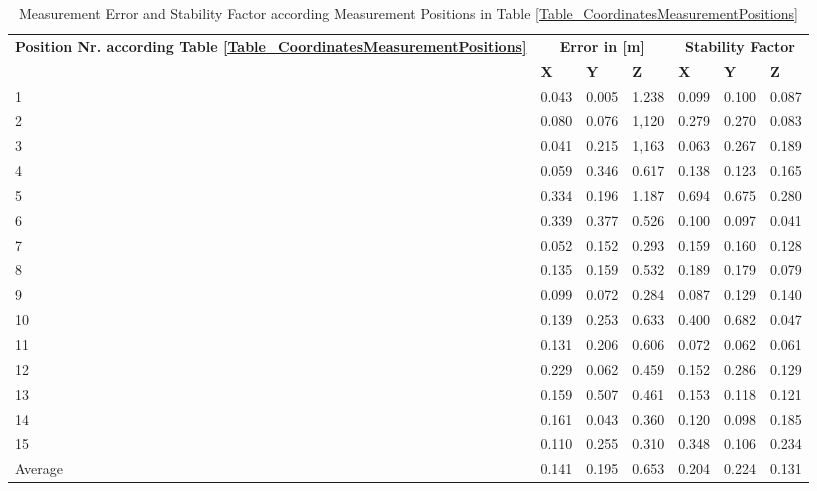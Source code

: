 \begin{table}[!h]
\begin{tabular}{|p{3cm}||p{}|p{}|p{}||p{}|p{}|p{}|}
\hline 
\textbf{Position Nr. according Table \ref{Table_CoordinatesMeasurementPositions}} & \multicolumn{3}{c||}{\textbf{Error in [m]}} & \multicolumn{3}{c|}{\textbf{Stability Factor}} \\ 
  & \textbf{X} & \textbf{Y} & \textbf{Z} & \textbf{X} & \textbf{Y} & \textbf{Z} \\ 
\hline
\hline 
1 & 0.043 & 0.005 & 1.238 & 0.099 & 0.100 & 0.087 \\ 
\hline 
2 & 0.080 & 0.076 & 1,120 & 0.279 & 0.270 & 0.083 \\ 
\hline 
3 & 0.041 & 0.215 & 1,163 & 0.063 & 0.267 & 0.189 \\ 
\hline 
4 & 0.059 & 0.346 & 0.617 & 0.138 & 0.123 & 0.165 \\ 
\hline 
5 & 0.334 & 0.196 & 1.187 & 0.694 & 0.675 & 0.280 \\ 
\hline 
6 & 0.339 & 0.377 & 0.526 & 0.100 & 0.097 & 0.041 \\ 
\hline 
7 & 0.052 & 0.152 & 0.293 & 0.159 & 0.160 & 0.128 \\ 
\hline 
8 & 0.135 & 0.159 & 0.532 & 0.189 & 0.179 & 0.079 \\ 
\hline 
9 & 0.099 & 0.072 & 0.284 & 0.087 & 0.129 & 0.140 \\ 
\hline 
10 & 0.139 & 0.253 & 0.633 & 0.400 & 0.682 & 0.047 \\ 
\hline 
11 & 0.131 & 0.206 & 0.606 & 0.072 & 0.062 & 0.061 \\ 
\hline 
12 & 0.229 & 0.062 & 0.459 & 0.152 & 0.286 & 0.129 \\ 
\hline 
13 & 0.159 & 0.507 & 0.461 & 0.153 & 0.118 & 0.121 \\ 
\hline 
14 & 0.161 & 0.043 & 0.360 & 0.120 & 0.098 & 0.185 \\ 
\hline 
15 & 0.110 & 0.255 & 0.310 & 0.348 & 0.106 & 0.234 \\ 
\hline 
\hline
Average & 0.141 & 0.195 & 0.653 & 0.204 & 0.224 & 0.131 \\ 
\hline 
\end{tabular} 
\caption{Measurement Error and Stability Factor according Measurement Positions in Table \ref{Table_CoordinatesMeasurementPositions}}
\label{Table_Measurement_M2} 
\end{table}